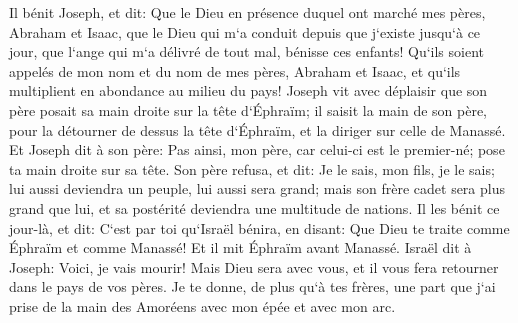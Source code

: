 \verse Il bénit Joseph, et dit: Que le Dieu en présence duquel ont marché mes pères, Abraham et Isaac, que le Dieu qui m`a conduit depuis que j`existe jusqu`à ce jour, 
\verse que l`ange qui m`a délivré de tout mal, bénisse ces enfants! Qu`ils soient appelés de mon nom et du nom de mes pères, Abraham et Isaac, et qu`ils multiplient en abondance au milieu du pays! 
\verse Joseph vit avec déplaisir que son père posait sa main droite sur la tête d`Éphraïm; il saisit la main de son père, pour la détourner de dessus la tête d`Éphraïm, et la diriger sur celle de Manassé. 
\verse Et Joseph dit à son père: Pas ainsi, mon père, car celui-ci est le premier-né; pose ta main droite sur sa tête. 
\verse Son père refusa, et dit: Je le sais, mon fils, je le sais; lui aussi deviendra un peuple, lui aussi sera grand; mais son frère cadet sera plus grand que lui, et sa postérité deviendra une multitude de nations. 
\verse Il les bénit ce jour-là, et dit: C`est par toi qu`Israël bénira, en disant: Que Dieu te traite comme Éphraïm et comme Manassé! Et il mit Éphraïm avant Manassé. 
\verse Israël dit à Joseph: Voici, je vais mourir! Mais Dieu sera avec vous, et il vous fera retourner dans le pays de vos pères. 
\verse Je te donne, de plus qu`à tes frères, une part que j`ai prise de la main des Amoréens avec mon épée et avec mon arc. 

